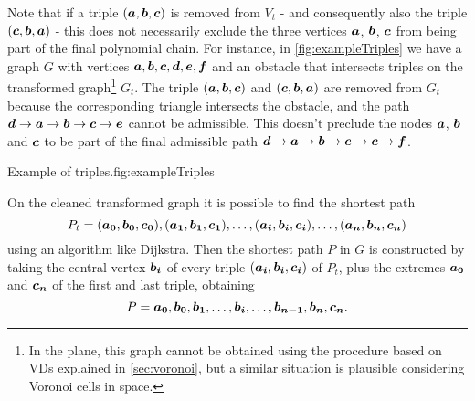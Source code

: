 \documentclass[dissertation.tex]{subfiles}
\begin{document}
Note that if a triple $(\boldsymbol{a},\boldsymbol{b},\boldsymbol{c})$ is removed from $V_t$ - and
consequently also the triple $(\boldsymbol{c},\boldsymbol{b},\boldsymbol{a})$ - this does not
necessarily exclude
the three vertices $\boldsymbol{a}$, $\boldsymbol{b}$, $\boldsymbol{c}$ from being part of the final
polynomial chain. For instance, in
\cref{fig:exampleTriples} we have a graph $G$ with vertices
$\boldsymbol{a},\boldsymbol{b},\boldsymbol{c},\boldsymbol{d},\boldsymbol{e},\boldsymbol{f}$ and an obstacle that
intersects triples on the transformed graph\footnote{In the plane, this graph cannot be
  obtained using the procedure based on \acp{VD} explained in
  \cref{sec:voronoi}, but a similar situation is plausible
  considering Voronoi cells in space.} $G_t$. The triple
$(\boldsymbol{a},\boldsymbol{b},\boldsymbol{c})$ and $(\boldsymbol{c},\boldsymbol{b},\boldsymbol{a})$ are removed from $G_t$ because
the corresponding triangle intersects the obstacle, and the path
$\boldsymbol{d}\rightarrow \boldsymbol{a}\rightarrow \boldsymbol{b}\rightarrow \boldsymbol{c}\rightarrow \boldsymbol{e}$ cannot be
admissible. This doesn't preclude the nodes $\boldsymbol{a}$, $\boldsymbol{b}$ and $\boldsymbol{c}$ to be part
of the final admissible path $\boldsymbol{d}\rightarrow \boldsymbol{a}\rightarrow \boldsymbol{b}\rightarrow \boldsymbol{e}\rightarrow \boldsymbol{c}\rightarrow \boldsymbol{f}$.
\begin{myfig}{Example of triples.}{fig:exampleTriples}
\end{myfig}

On the cleaned transformed graph it is possible to find the shortest
path
$$
P_t=(\boldsymbol{a_0},\boldsymbol{b_0},\boldsymbol{c_0}), (\boldsymbol{a_1},\boldsymbol{b_1},\boldsymbol{c_1}),\dots,(\boldsymbol{a_i},\boldsymbol{b_i},\boldsymbol{c_i}),\dots,(\boldsymbol{a_n},\boldsymbol{b_n},\boldsymbol{c_n})
$$
 using
an algorithm like Dijkstra. Then the shortest
path $P$ in $G$ is constructed by taking the central vertex $\boldsymbol{b_i}$
of every 
triple $(\boldsymbol{a_i},\boldsymbol{b_i},\boldsymbol{c_i})$ of $P_t$, plus the extremes $\boldsymbol{a_0}$ and $\boldsymbol{c_n}$
of the first and last triple, obtaining
$$
P=\boldsymbol{a_0},\boldsymbol{b_0},\boldsymbol{b_1},\dots,\boldsymbol{b_i},\dots,\boldsymbol{b_{n-1}},\boldsymbol{b_n},\boldsymbol{c_n}.
$$
\end{document}
